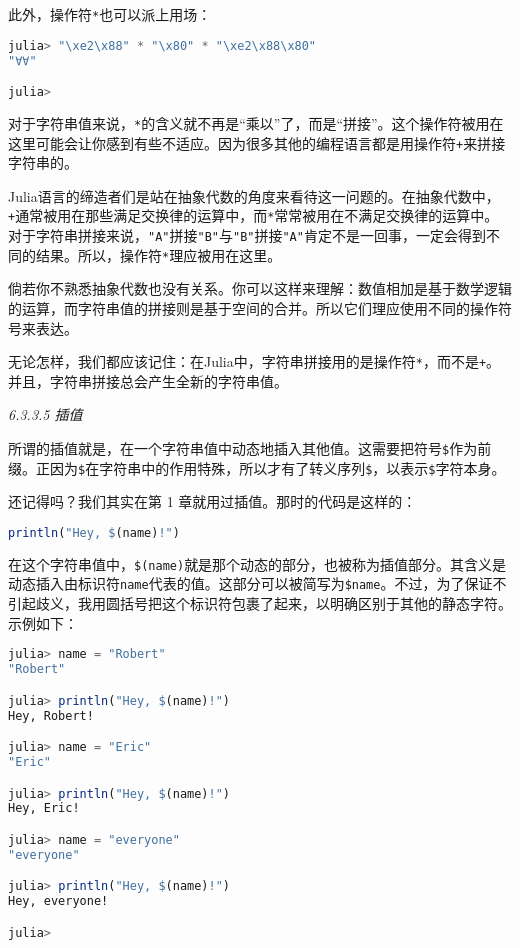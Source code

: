 此外，操作符\verb`*`也可以派上用场：
\begin{lstlisting}[language=julia]
julia> "\xe2\x88" * "\x80" * "\xe2\x88\x80"
"∀∀"

julia> 
\end{lstlisting}

对于字符串值来说，\verb`*`的含义就不再是“乘以”了，而是“拼接”。这个操作符被用在这里可能会让你感到有些不适应。因为很多其他的编程语言都是用操作符\verb`+`来拼接字符串的。

Julia语言的缔造者们是站在抽象代数的角度来看待这一问题的。在抽象代数中，\verb`+`通常被用在那些满足交换律的运算中，而\verb`*`常常被用在不满足交换律的运算中。对于字符串拼接来说，\verb`"A"`拼接\verb`"B"`与\verb`"B"`拼接\verb`"A"`肯定不是一回事，一定会得到不同的结果。所以，操作符\verb`*`理应被用在这里。

倘若你不熟悉抽象代数也没有关系。你可以这样来理解：数值相加是基于数学逻辑的运算，而字符串值的拼接则是基于空间的合并。所以它们理应使用不同的操作符号来表达。

无论怎样，我们都应该记住：在Julia中，字符串拼接用的是操作符\verb`*`，而不是\verb`+`。并且，字符串拼接总会产生全新的字符串值。

\textsl{6.3.3.5 插值}

所谓的插值就是，在一个字符串值中动态地插入其他值。这需要把符号\verb`$`作为前缀。正因为\verb`$`在字符串中的作用特殊，所以才有了转义序列\verb`$`，以表示\verb`$`字符本身。

还记得吗？我们其实在第 1 章就用过插值。那时的代码是这样的：
\begin{lstlisting}[language=julia]
println("Hey, $(name)!")
\end{lstlisting}

在这个字符串值中，\verb`$(name)`就是那个动态的部分，也被称为插值部分。其含义是动态插入由标识符\verb`name`代表的值。这部分可以被简写为\verb`$name`。不过，为了保证不引起歧义，我用圆括号把这个标识符包裹了起来，以明确区别于其他的静态字符。示例如下：
\begin{lstlisting}[language=julia]
julia> name = "Robert"
"Robert"

julia> println("Hey, $(name)!")
Hey, Robert!

julia> name = "Eric"
"Eric"

julia> println("Hey, $(name)!")
Hey, Eric!

julia> name = "everyone"
"everyone"

julia> println("Hey, $(name)!")
Hey, everyone!

julia> 
\end{lstlisting}

